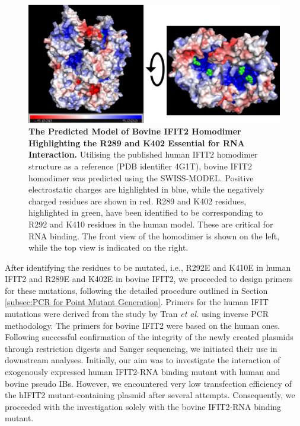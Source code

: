 \begin{figure}
    \centering
    \includegraphics[width=1\linewidth]{09. Chapter 4/Figs/01. pIB/03. IFIT2/05. IFIT2-RNA binding mutant/01. Structure/01. structure.png}
    \caption[The Predicted Model of Bovine IFIT2 Homodimer Highlighting the R289 and K402 Essential for RNA Interaction.]{\textbf{The Predicted Model of Bovine IFIT2 Homodimer Highlighting the R289 and K402 Essential for RNA Interaction.} Utilising the published human IFIT2 homodimer structure as a reference (PDB identifier 4G1T), bovine IFIT2 homodimer was predicted using the SWISS-MODEL. Positive electrostatic charges are highlighted in blue, while the negatively charged residues are shown in red. R289 and K402 residues, highlighted in green, have been identified to be corresponding to R292 and K410 residues in the human model. These are critical for RNA binding. The front view of the homodimer is shown on the left, while the top view is indicated on the right.}
    \label{fig:ifit2 mutant structure}
\end{figure}

After identifying the residues to be mutated, i.e., R292E and K410E in human IFIT2 and R289E and K402E in bovine IFIT2, we proceeded to design primers for these mutations, following the detailed procedure outlined in Section \ref{subsec:PCR for Point Mutant Generation}. Primers for the human IFIT mutations were derived from the study by Tran \textit{et al.} \cite{Tran2020InfluenzaMRNAs} using inverse PCR methodology. The primers for bovine IFIT2 were based on the human ones. Following successful confirmation of the integrity of the newly created plasmids through restriction digests and Sanger sequencing, we initiated their use in downstream analyses. Initially, our aim was to investigate the interaction of exogenously expressed human IFIT2-RNA binding mutant with human and bovine pseudo IBs. However, we encountered very low transfection efficiency of the hIFIT2 mutant-containing plasmid after several attempts. Consequently, we proceeded with the investigation solely with the bovine IFIT2-RNA binding mutant.

